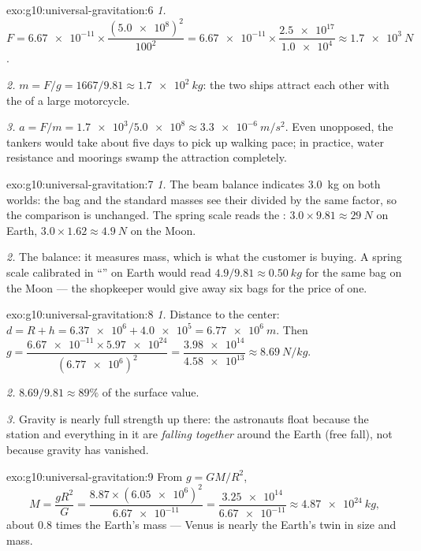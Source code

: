 \begin{solution}{exo:g10:universal-gravitation:6}
\emph{1.} $F = \num{6.67e-11} \times
\dfrac{(\num{5.0e8})^2}{100^2}
= \num{6.67e-11} \times \dfrac{\num{2.5e17}}{\num{1.0e4}}
\approx \qty{1.7e3}{N}$.

\emph{2.} $m = F/g = 1667/9.81 \approx \qty{1.7e2}{kg}$: the two ships
attract each other with the  of a large motorcycle.

\emph{3.} $a = F/m = \num{1.7e3}/\num{5.0e8} \approx
\qty{3.3e-6}{m/s^2}$. Even unopposed, the tankers would take about
five days to pick up walking pace; in practice, water resistance and moorings
swamp the attraction completely.
\end{solution}

\begin{solution}{exo:g10:universal-gravitation:7}
\emph{1.} The beam balance indicates \qty{3.0}{kg} on both worlds: the
bag and the standard masses see their  divided by the same
factor, so the comparison is unchanged. The spring scale reads the
: $3.0 \times 9.81 \approx \qty{29}{N}$ on Earth,
$3.0 \times 1.62 \approx \qty{4.9}{N}$ on the Moon.

\emph{2.} The balance: it measures mass, which is what the customer is
buying. A spring scale calibrated in ``'' on Earth would read
$4.9/9.81 \approx \qty{0.50}{kg}$ for the same bag on the Moon --- the
shopkeeper would give away six bags for the price of one.
\end{solution}

\begin{solution}{exo:g10:universal-gravitation:8}
\emph{1.} Distance to the center:
$d = R + h = \num{6.37e6} + \num{4.0e5} = \qty{6.77e6}{m}$. Then
$g = \dfrac{\num{6.67e-11} \times \num{5.97e24}}{(\num{6.77e6})^2}
= \dfrac{\num{3.98e14}}{\num{4.58e13}} \approx \qty{8.69}{N/kg}$.

\emph{2.} $8.69/9.81 \approx 89\%$ of the surface value.

\emph{3.} Gravity is nearly full strength up there: the astronauts
float because the station and everything in it are \emph{falling
together} around the Earth (free fall), not because gravity has
vanished.
\end{solution}

\begin{solution}{exo:g10:universal-gravitation:9}
From $g = GM/R^2$,
\[
M = \frac{g R^2}{G}
= \frac{8.87 \times (\num{6.05e6})^2}{\num{6.67e-11}}
= \frac{\num{3.25e14}}{\num{6.67e-11}}
\approx \qty{4.87e24}{kg},
\]
about $0.8$ times the Earth's mass --- Venus is nearly the Earth's
twin in size and mass.
\end{solution}

